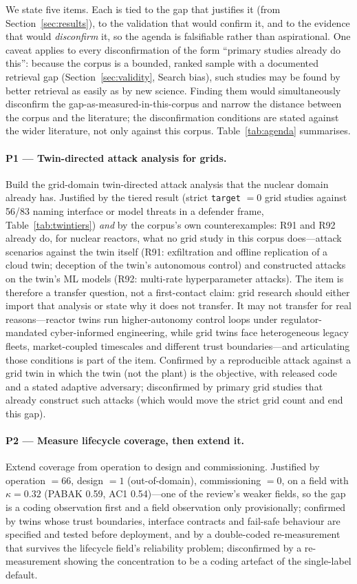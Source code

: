\documentclass[preprint,12pt]{elsarticle}
\renewcommand{\_}{\plainunderscore\allowbreak}
\begin{document}
We state five items. Each is tied to the gap that justifies it (from Section~\ref{sec:results}),
to the validation that would confirm it, and to the evidence that would \emph{disconfirm} it,
so the agenda is falsifiable rather than aspirational. One caveat applies to every
disconfirmation of the form ``primary studies already do this'': because the corpus is a
bounded, ranked sample with a documented retrieval gap (Section~\ref{sec:validity}, Search
bias), such studies may be found by better retrieval as easily as by new science. Finding
them would simultaneously disconfirm the gap-as-measured-in-this-corpus and narrow the
distance between the corpus and the literature; the disconfirmation conditions are stated
against the wider literature, not only against this corpus.
Table~\ref{tab:agenda} summarises.

\paragraph{P1 --- Twin-directed attack analysis for grids.}
  Build the grid-domain twin-directed attack analysis that the nuclear domain already has.
  Justified by the tiered result (strict \texttt{target} $= 0$ grid studies against 56/83
  naming interface or model threats in a defender frame, Table~\ref{tab:twintiers})
  \emph{and} by the corpus's own counterexamples: R91 and R92 already do, for nuclear
  reactors, what no grid study in this corpus does---attack scenarios against the twin
  itself (R91: exfiltration and offline replication of a cloud twin; deception of the
  twin's autonomous control) and constructed attacks on the twin's ML models (R92:
  multi-rate hyperparameter attacks). The item is therefore a transfer question, not a
  first-contact claim: grid research should either import that analysis or state why it
  does not transfer. It may not transfer for real reasons---reactor twins run
  higher-autonomy control loops under regulator-mandated cyber-informed engineering,
  while grid twins face heterogeneous legacy fleets, market-coupled timescales and
  different trust boundaries---and articulating those conditions is part of the item.
  Confirmed by a reproducible attack against a grid twin in which the twin (not the
  plant) is the objective, with released code and a stated adaptive adversary;
  disconfirmed by primary grid studies that already construct such attacks (which would
  move the strict grid count and end this gap).
\paragraph{P2 --- Measure lifecycle coverage, then extend it.}
Extend coverage from operation to design and commissioning. Justified by
  operation $=66$, design $=1$ (out-of-domain), commissioning $=0$, on a field
  with $\kappa = 0.32$ (PABAK 0.59, AC1 0.54)---one of the review's weaker fields, so the gap
  is a coding observation first and a field observation only provisionally; confirmed by
  twins whose trust boundaries, interface contracts and fail-safe
  behaviour are specified and tested before deployment, and by a double-coded re-measurement
  that survives the lifecycle field's reliability problem; disconfirmed by a re-measurement
  showing the concentration to be a coding artefact of the single-label default.
\end{document}
